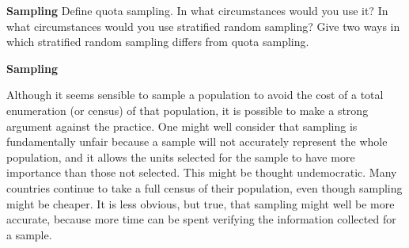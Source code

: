 \textbf{Sampling}
Define quota sampling. In what circumstances would you use it?
In what circumstances would you use stratified random sampling?
Give two ways in which stratified random sampling differs from quota sampling.


\textbf{Sampling}


Although it seems sensible to sample a population to avoid the
cost of a total enumeration (or census) of that population, it is
possible to make a strong argument against the practice. One might
well consider that sampling is fundamentally unfair because a
sample will not accurately represent the whole population, and it
allows the units selected for the sample to have more importance
than those not selected. This might be thought undemocratic. Many
countries continue to take a full census of their population, even
though sampling might be cheaper. It is less obvious, but true,
that sampling might well be more accurate, because more time can
be spent verifying the information collected for a sample.



